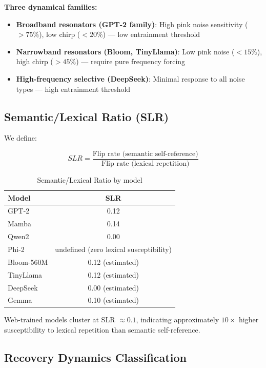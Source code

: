 \documentclass{article}
\begin{document}
\textbf{Three dynamical families:}
\begin{itemize}
    \item \textbf{Broadband resonators (GPT-2 family)}: High pink noise sensitivity ($>75\%$), low chirp ($<20\%$) — low entrainment threshold
    \item \textbf{Narrowband resonators (Bloom, TinyLlama)}: Low pink noise ($<15\%$), high chirp ($>45\%$) — require pure frequency forcing
    \item \textbf{High-frequency selective (DeepSeek)}: Minimal response to all noise types — high entrainment threshold
\end{itemize}

\subsection{Semantic/Lexical Ratio (SLR)}

We define:

$$SLR = \frac{\text{Flip rate (semantic self-reference)}}{\text{Flip rate (lexical repetition)}}$$

\begin{table}[H]
\centering
\caption{Semantic/Lexical Ratio by model}
\label{tab:slr}
\begin{tabular}{lc}
\toprule
Model & SLR \\
\midrule
GPT-2 & 0.12 \\
Mamba & 0.14 \\
Qwen2 & 0.00 \\
Phi-2 & undefined (zero lexical susceptibility) \\
Bloom-560M & 0.12 (estimated) \\
TinyLlama & 0.12 (estimated) \\
DeepSeek & 0.00 (estimated) \\
Gemma & 0.10 (estimated) \\
\bottomrule
\end{tabular}
\end{table}

Web-trained models cluster at SLR $\approx 0.1$, indicating approximately $10\times$ higher susceptibility to lexical repetition than semantic self-reference.

\subsection{Recovery Dynamics Classification}
\end{document}
